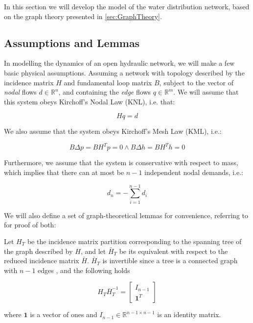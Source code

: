In this section we will develop the model of the water distribution network, based on the graph theory presented in \cref{sec:GraphTheory}.

\subsection{Assumptions and Lemmas}\label{subsec:AsssumAndLemmas}

In modelling the dynamics of an open hydraulic network, we will make a few basic physical assumptions. Assuming a network with topology described by the incidence matrix $H$ and fundamental loop matrix $B$, subject to the vector of \textit{nodal} flows $d \in \mathbb{R}^n$, and containing the \textit{edge} flows $q \in \mathbb{R}^m$. We will assume that this system obeys Kirchoff's Nodal Law (KNL), i.e. that:

\begin{equation}\label{eq:KirchNodeLaw}
	Hq = d
\end{equation} 

We also assume that the system obeys Kirchoff's Mesh Law (KML), i.e.:

\begin{equation}\label{eq:KirchMeshLaw}
	B\Delta p = B H^T p = 0 \wedge B\Delta h = B H^T h = 0
\end{equation}

Furthermore, we assume that the system is conservative with respect to mass, which implies that there can at most be $n-1$ independent nodal demands, i.e.:

\begin{equation}\label{eq:MassConservation}
	d_n = -\sum_{i=1}^{n-1}d_i
\end{equation}

We will also define a set of graph-theoretical lemmas for convenience, referring to \cite{Jensen} for proof of both:

\begin{lemma}\label{lem:TreePartitionLemma}
	Let $H_T$ be the incidence matrix partition corresponding to the spanning tree of the graph described by $H$, and let $\bar{H}_T$ be its equivalent with respect to the reduced incidence matrix $\bar{H}$. $\bar{H}_T$ is invertible since a tree is a connected graph with $n-1$ edges \cite{Deo}, and the following holds
	
	\begin{equation}\label{eq:TreePartitionLemma}
		H_T\bar{H}_T^{-1} = \begin{bmatrix} I_{n-1} \\ \mathbf{1}^T	\end{bmatrix}
	\end{equation}

where $\mathbf{1}$ is a vector of ones and $I_{n-1} \in \mathbb{R}^{n-1 \times n-1}$ is an identity matrix.
\end{lemma}

